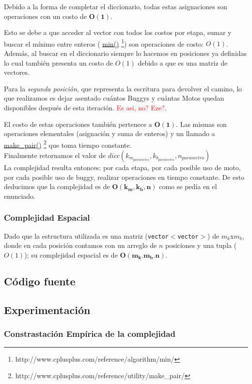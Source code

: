 Debido a la forma de completar el diccionario, todas estas asignaciones son operaciones con un costo de $\mathbf{O(1)}$. 

Esto se debe a que acceder al vector con todos los costos por etapa, sumar y buscar el m\'inimo entre enteros ( \href{http://www.cplusplus.com/reference/algorithm/min/}{min()} \footnote{http://www.cplusplus.com/reference/algorithm/min/}) son operaciones de costo: $O(1)$. Adem\'as, al buscar en el diccionario siempre lo hacemos en posiciones ya definidas lo cual tambi\'en presenta un costo de $O(1)$ debido a que es una matriz de vectores.\\

\newpage

Para la \emph{segunda posici\'on}, que representa la escritura para devolver el camino, lo que realizamos es dejar asentado cu\'antos Buggys y cu\'antas Motos quedan disponibles despu\'es de esta iteraci\'on. \textcolor{red}{Es asi, no? Eze?}.

El costo de estas operaciones tambi\'en pertenece a $\mathbf{O(1)}$. Las mismas son operaciones elementales (asignaci\'on y suma de enteros) y un llamado a  \href{http://www.cplusplus.com/reference/utility/make_pair/}{make\_pair()} \footnote{http://www.cplusplus.com/reference/utility/make_pair/} que toma tiempo constante.\\



Finalmente retornamos el valor de $dicc(k_{m_{parametro}},k_{b_{parametro}},n_{parametro})$\\

La complejidad resulta entonces: por cada etapa, por cada posible uso de moto, por cada posible uso de buggy, realizar operaciones en tiempo constante. De esto deducimos que la complejidad es de $\mathbf{O(k_{m},k_{b},n)}$ como se ped\'ia en el enunciado.

\subsubsection{Complejidad Espacial}
Dado que la estructura utilizada es una matriz (\texttt{vector$<$vector$>$}) de $m_k$x$m_b$, donde en cada posici\'on contamos con un arreglo de $n$ posiciones y una tupla ($O(1)$); su complejidad espacial es de $\mathbf{O(m_k.m_b.n)}$.

\newpage
\subsection{C\'odigo fuente}
\subsection{Experimentaci\'on}

\subsubsection{Constrastaci\'on Emp\'irica de la complejidad}
